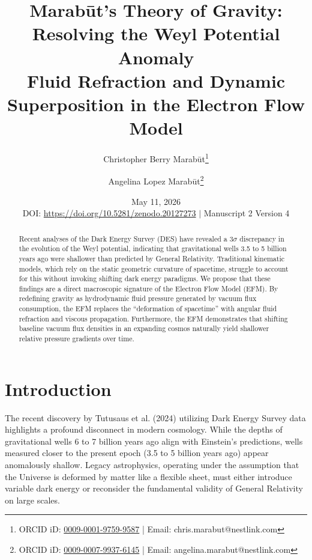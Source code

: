 \documentclass[11pt, a4paper]{article}
\title{\textbf{Marab\={u}t's Theory of Gravity: \\ Resolving the Weyl Potential Anomaly} \\[1em] \large{Fluid Refraction and Dynamic Superposition in the Electron Flow Model}}
\author[1]{Christopher Berry Marab\={u}t\thanks{ORCID iD: \href{https://orcid.org/0009-0001-9759-9587}{0009-0001-9759-9587} | Email: chris.marabut@nestlink.com}}
\author[1]{Angelina Lopez Marab\={u}t\thanks{ORCID iD: \href{https://orcid.org/0009-0007-9937-6145}{0009-0007-9937-6145} | Email: angelina.marabut@nestlink.com}}
\affil[1]{Independent Researchers}
\date{May 11, 2026 \\[1.5em] \small{DOI: \url{https://doi.org/10.5281/zenodo.20127273} $|$ Manuscript 2 Version 4}}
\begin{document}

\maketitle

\begin{abstract}
Recent analyses of the Dark Energy Survey (DES) have revealed a $3\sigma$ discrepancy in the evolution of the Weyl potential, indicating that gravitational wells 3.5 to 5 billion years ago were shallower than predicted by General Relativity. Traditional kinematic models, which rely on the static geometric curvature of spacetime, struggle to account for this without invoking shifting dark energy paradigms. We propose that these findings are a direct macroscopic signature of the Electron Flow Model (EFM). By redefining gravity as hydrodynamic fluid pressure generated by vacuum flux consumption, the EFM replaces the ``deformation of spacetime'' with angular fluid refraction and viscous propagation. Furthermore, the EFM demonstrates that shifting baseline vacuum flux densities in an expanding cosmos naturally yield shallower relative pressure gradients over time.
\end{abstract}

\section{Introduction}
The recent discovery by Tutusaus et al. (2024) \cite{tutusaus2024} utilizing Dark Energy Survey data highlights a profound disconnect in modern cosmology. While the depths of gravitational wells 6 to 7 billion years ago align with Einstein's predictions, wells measured closer to the present epoch (3.5 to 5 billion years ago) appear anomalously shallow. Legacy astrophysics, operating under the assumption that the Universe is deformed by matter like a flexible sheet, must either introduce variable dark energy or reconsider the fundamental validity of General Relativity on large scales. 
\end{document}
